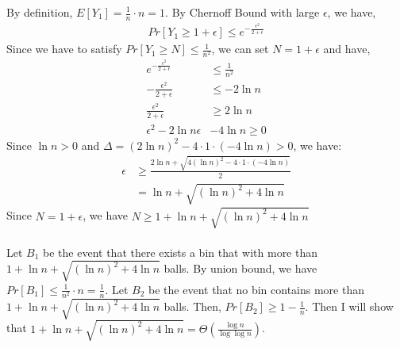 By definition, $E[Y_1]=\frac{1}{n}\cdot n =1$.
By Chernoff Bound with large $\epsilon$, we have,
\begin{align}
    \nonumber Pr[Y_1\ge 1+\epsilon] \le e^{-\frac{\epsilon^2}{2+\epsilon}}
\end{align}
Since we have to satisfy $Pr[Y_1\ge N] \le \frac{1}{n^2}$, we can set $N=1+\epsilon$ and have,
\begin{align}
    \nonumber e^{-\frac{\epsilon^2}{2+\epsilon}} &\le \frac{1}{n^2}\\
    \nonumber -\frac{\epsilon^2}{2+\epsilon} &\le -2\ln n\\
    \nonumber \frac{\epsilon^2}{2+\epsilon} &\ge 2\ln n\\
    \nonumber \epsilon^2 -2\ln n \epsilon& -4\ln n \ge 0
\end{align}
Since $\ln n >0$ and $\Delta=(2\ln n)^2-4\cdot 1 \cdot (-4\ln n)>0$, we have:
\begin{align}
   \nonumber \epsilon &\ge \frac{2\ln n +\sqrt{4(\ln n)^2-4\cdot 1 \cdot (-4\ln n)}}{2}\\
   \nonumber &=\ln n+ \sqrt{(\ln n)^2+4\ln n}
\end{align}
Since $N=1+\epsilon$, we have $N \ge 1+\ln n+ \sqrt{(\ln n)^2+4\ln n}$\\
\noindent{}\\
Let $B_1$ be the event that there exists a bin that with more than $1+\ln n+ \sqrt{(\ln n)^2+4\ln n}$ balls.
By union bound, we have $Pr[B_1]\le\frac{1}{n^2}\cdot n=\frac{1}{n}$.
Let $B_2$ be the event that no bin contains more than $1+\ln n+ \sqrt{(\ln n)^2+4\ln n}$ balls.
Then, $Pr[B_2]\ge 1-\frac{1}{n}$.
Then I will show that $1+\ln n+ \sqrt{(\ln n)^2+4\ln n}=\Theta(\frac{\log n}{\log\log n})$.